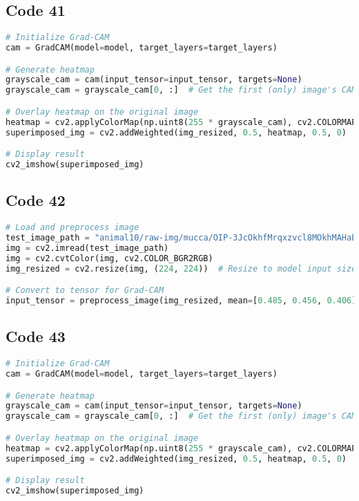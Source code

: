 \documentclass{article}
\begin{document}
\subsection*{Code 41}
\begin{lstlisting}[language=Python]
# Initialize Grad-CAM
cam = GradCAM(model=model, target_layers=target_layers)

# Generate heatmap
grayscale_cam = cam(input_tensor=input_tensor, targets=None)
grayscale_cam = grayscale_cam[0, :]  # Get the first (only) image's CAM

# Overlay heatmap on the original image
heatmap = cv2.applyColorMap(np.uint8(255 * grayscale_cam), cv2.COLORMAP_JET)
superimposed_img = cv2.addWeighted(img_resized, 0.5, heatmap, 0.5, 0)

# Display result
cv2_imshow(superimposed_img)

\end{lstlisting}

\subsection*{Code 42}
\begin{lstlisting}[language=Python]
# Load and preprocess image
test_image_path = "animal10/raw-img/mucca/OIP-3JcOkhfMrqxzvcl8MOkhMAHaEK.jpeg"  # Change path to an actual image
img = cv2.imread(test_image_path)
img = cv2.cvtColor(img, cv2.COLOR_BGR2RGB)
img_resized = cv2.resize(img, (224, 224))  # Resize to model input size

# Convert to tensor for Grad-CAM
input_tensor = preprocess_image(img_resized, mean=[0.485, 0.456, 0.406], std=[0.229, 0.224, 0.225])
\end{lstlisting}

\subsection*{Code 43}
\begin{lstlisting}[language=Python]
# Initialize Grad-CAM
cam = GradCAM(model=model, target_layers=target_layers)

# Generate heatmap
grayscale_cam = cam(input_tensor=input_tensor, targets=None)
grayscale_cam = grayscale_cam[0, :]  # Get the first (only) image's CAM

# Overlay heatmap on the original image
heatmap = cv2.applyColorMap(np.uint8(255 * grayscale_cam), cv2.COLORMAP_JET)
superimposed_img = cv2.addWeighted(img_resized, 0.5, heatmap, 0.5, 0)

# Display result
cv2_imshow(superimposed_img)
\end{lstlisting}
\end{document}
